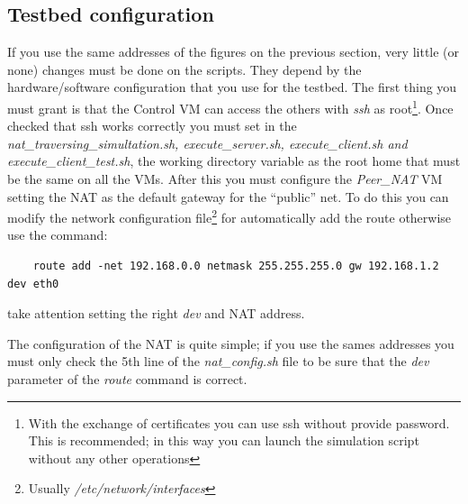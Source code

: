 \subsection{Testbed configuration}
\label{sec:testbed_configuration}
If you use the same addresses of the figures on the previous section, very little (or none) changes must be done on the scripts. They depend by the hardware/software configuration that you use for the testbed.
The first thing you must grant is that the Control VM can access the others with \emph{ssh} as root\footnote{With the exchange of certificates you can use ssh without provide password. This is recommended; in this way you can launch the simulation script without any other operations}. Once checked that ssh works correctly you must set in the \emph{nat\_traversing\_simultation.sh, execute\_server.sh, execute\_client.sh and execute\_client\_test.sh}, the working directory variable as the root home that must be the same on all the VMs.
After this you must configure the \emph{Peer\_NAT} VM setting the NAT as the default gateway for the ``public'' net. To do this you can modify the network configuration file\footnote{Usually \emph{/etc/network/interfaces}} for automatically add the route otherwise use the command:
\begin{verbatim}
	route add -net 192.168.0.0 netmask 255.255.255.0 gw 192.168.1.2 dev eth0
\end{verbatim}
take attention setting the right \emph{dev} and NAT address.

The configuration of the NAT is quite simple; if you use the sames addresses you must only check the 5th line of the \emph{nat\_config.sh} file to be sure that the \emph{dev} parameter of the \emph{route} command is correct.